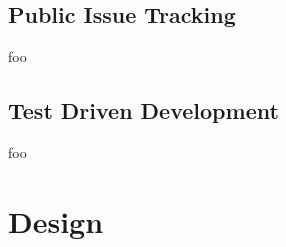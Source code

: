 \documentclass[12pt, a4paper]{article}
\begin{document}
\subsection{Public Issue Tracking}



foo


\subsection{Test Driven Development}

foo

\pagebreak


\section{Design}

%
%
\end{document}
